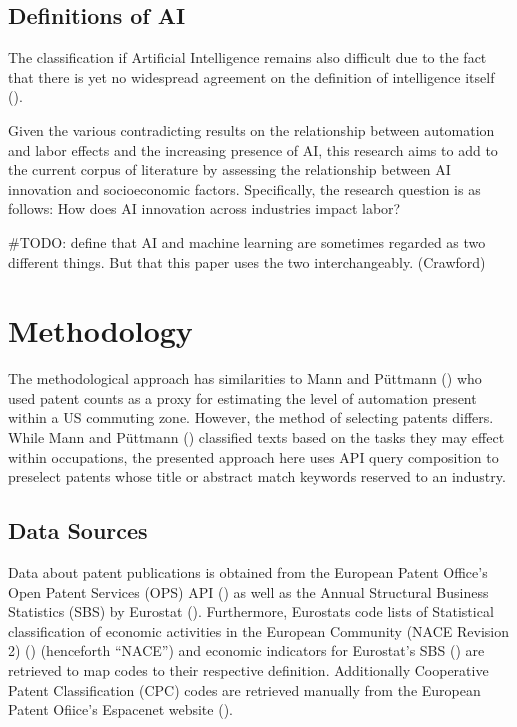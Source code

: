 \documentclass[
  11,
  a4paperpaper,
]{article}
\let\oldsection\section
\renewcommand\section{\clearpage\oldsection}
\begin{document}
\subsection{Definitions of AI}\label{definitions-of-ai}

The classification if Artificial Intelligence remains also difficult due
to the fact that there is yet no widespread agreement on the definition
of intelligence itself ().

Given the various contradicting results on the relationship between
automation and labor effects and the increasing presence of AI, this
research aims to add to the current corpus of literature by assessing
the relationship between AI innovation and socioeconomic factors.
Specifically, the research question is as follows: How does AI
innovation across industries impact labor?

\#TODO: define that AI and machine learning are sometimes regarded as
two different things. But that this paper uses the two interchangeably.
(Crawford)

\section{Methodology}\label{methodology}

The methodological approach has similarities to Mann and Püttmann
() who used patent counts as
a proxy for estimating the level of automation present within a US
commuting zone. However, the method of selecting patents differs. While
Mann and Püttmann () classified
texts based on the tasks they may effect within occupations, the
presented approach here uses API query composition to preselect patents
whose title or abstract match keywords reserved to an industry.

\subsection{Data Sources}\label{sec-data-sources}

Data about patent publications is obtained from the European Patent
Office's Open Patent Services (OPS) API
() as well as the Annual Structural Business Statistics (SBS) by
Eurostat
(). Furthermore, Eurostats code lists of
Statistical classification of economic activities in the European
Community (NACE Revision 2)
() (henceforth ``NACE'') and economic
indicators for Eurostat's SBS
() are retrieved to map codes to their
respective definition. Additionally Cooperative Patent Classification
(CPC) codes are retrieved manually from the European Patent Ofiice's
Espacenet website
().
\end{document}
